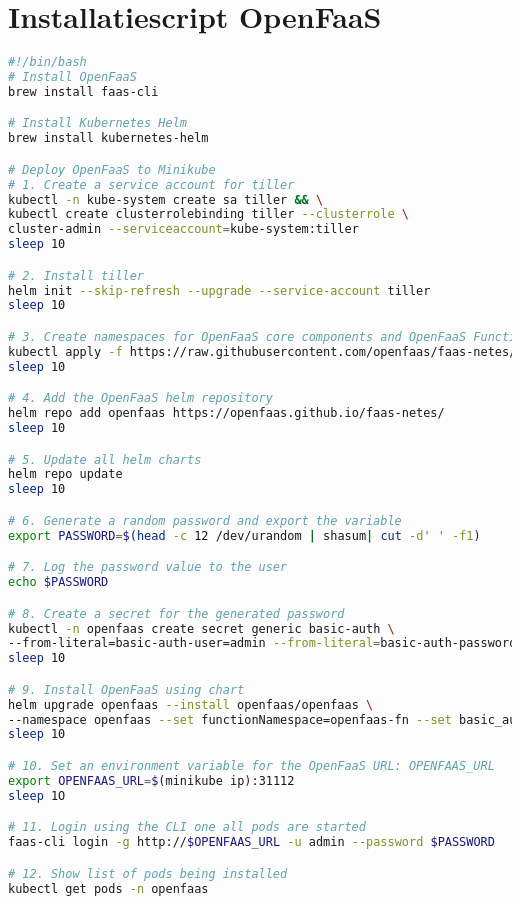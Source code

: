 \section{Installatiescript OpenFaaS}
\label{sec:installatie-openfaas}
\begin{lstlisting}[language=bash]
#!/bin/bash
# Install OpenFaaS
brew install faas-cli

# Install Kubernetes Helm
brew install kubernetes-helm

# Deploy OpenFaaS to Minikube
# 1. Create a service account for tiller
kubectl -n kube-system create sa tiller && \
kubectl create clusterrolebinding tiller --clusterrole \
cluster-admin --serviceaccount=kube-system:tiller
sleep 10

# 2. Install tiller
helm init --skip-refresh --upgrade --service-account tiller
sleep 10

# 3. Create namespaces for OpenFaaS core components and OpenFaaS Functions
kubectl apply -f https://raw.githubusercontent.com/openfaas/faas-netes/master/namespaces.yml
sleep 10

# 4. Add the OpenFaaS helm repository
helm repo add openfaas https://openfaas.github.io/faas-netes/
sleep 10

# 5. Update all helm charts
helm repo update
sleep 10

# 6. Generate a random password and export the variable
export PASSWORD=$(head -c 12 /dev/urandom | shasum| cut -d' ' -f1)

# 7. Log the password value to the user
echo $PASSWORD

# 8. Create a secret for the generated password
kubectl -n openfaas create secret generic basic-auth \
--from-literal=basic-auth-user=admin --from-literal=basic-auth-password="$PASSWORD"
sleep 10

# 9. Install OpenFaaS using chart
helm upgrade openfaas --install openfaas/openfaas \
--namespace openfaas --set functionNamespace=openfaas-fn --set basic_auth=true
sleep 10

# 10. Set an environment variable for the OpenFaaS URL: OPENFAAS_URL
export OPENFAAS_URL=$(minikube ip):31112
sleep 1O

# 11. Login using the CLI one all pods are started
faas-cli login -g http://$OPENFAAS_URL -u admin --password $PASSWORD

# 12. Show list of pods being installed
kubectl get pods -n openfaas
\end{lstlisting}